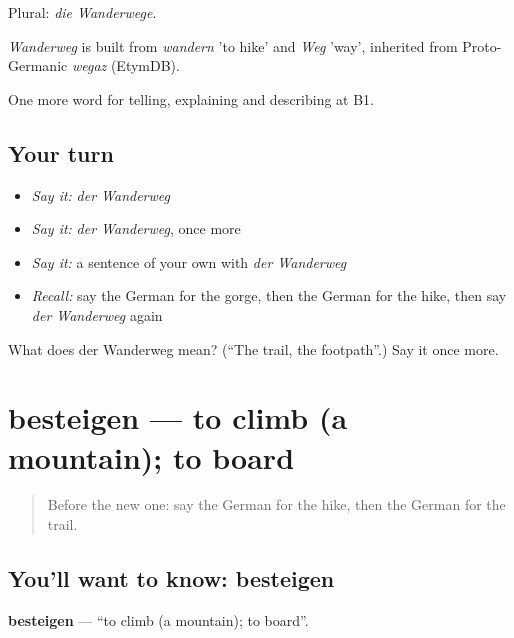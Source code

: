 Plural: \emph{die Wanderwege}.

\begin{cousinweb}
\emph{Wanderweg} is built from \emph{wandern} 'to hike' and \emph{Weg} 'way', inherited from Proto-Germanic \emph{wegaz} (EtymDB).
\end{cousinweb}

\begin{grammarlens}[title={What you've built}]
One more word for telling, explaining and describing at B1.
\end{grammarlens}

\subsection*{Your turn}
\begin{itemize}
\raggedright
  \item \emph{Say it:} \emph{der Wanderweg}
  \item \emph{Say it:} \emph{der Wanderweg}, once more
  \item \emph{Say it:} a sentence of your own with \emph{der Wanderweg}
  \item \emph{Recall:} say the German for the gorge, then the German for the hike, then say \emph{der Wanderweg} again
\end{itemize}

\begin{tcolorbox}[breakable,colback=teal!4,colframe=teal!35!black,title={Before you move on}]
What does der Wanderweg mean? (\textquotedblleft{}The trail, the footpath\textquotedblright{}.) Say it once more.
\end{tcolorbox}
\section[besteigen]{besteigen — to climb (a mountain); to board}

\label{lesson:GE-C454-besteigen}



\begin{quote}
Before the new one: say the German for the hike, then the German for the trail.
\end{quote}

\subsection*{You'll want to know: besteigen}
\textbf{besteigen} — \textquotedblleft{}to climb (a mountain); to board\textquotedblright{}.

